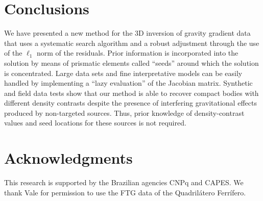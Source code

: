 \documentclass{segabs}
\begin{document}
\vspace{-0.4cm}
\section{Conclusions}

We have presented a new method for the 3D inversion of gravity gradient data
that uses a systematic search algorithm and a robust adjustment through the use of
the $\ell_1$ norm of the residuals.
Prior information is incorporated into the solution by means of prismatic elements
called ``seeds'' around which the solution is concentrated.
Large data sets and fine interpretative models can be easily handled by implementing
a ``lazy evaluation'' of the Jacobian matrix.
Synthetic and field data tests show that our method is able to recover compact bodies
with different density contrasts despite the presence of interfering
gravitational effects produced by non-targeted sources.
Thus, prior knowledge of density-contrast values and seed locations for
these sources is not required.

\vspace{-0.4cm}
\section{Acknowledgments}

This research is supported by the Brazilian agencies CNPq and CAPES.
We thank Vale for permission to use the FTG data of the Quadril\'atero Ferr\'ifero.
\end{document}
